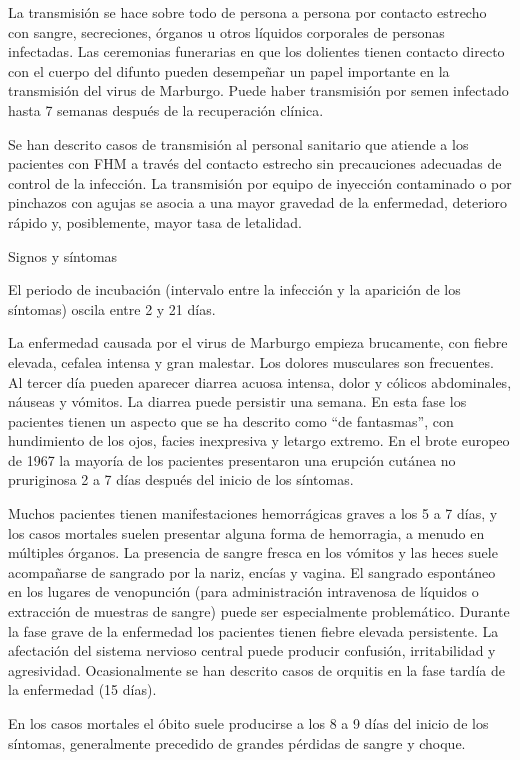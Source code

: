 La transmisión se hace sobre todo de persona a persona por contacto estrecho con sangre, secreciones, órganos u otros líquidos corporales de personas infectadas. Las ceremonias funerarias en que los dolientes tienen contacto directo con el cuerpo del difunto pueden desempeñar un papel importante en la transmisión del virus de Marburgo. Puede haber transmisión por semen infectado hasta 7 semanas después de la recuperación clínica.

Se han descrito casos de transmisión al personal sanitario que atiende a los pacientes con FHM a través del contacto estrecho sin precauciones adecuadas de control de la infección. La transmisión por equipo de inyección contaminado o por pinchazos con agujas se asocia a una mayor gravedad de la enfermedad, deterioro rápido y, posiblemente, mayor tasa de letalidad.

Signos y síntomas

El periodo de incubación (intervalo entre la infección y la aparición de los síntomas) oscila entre 2 y 21 días.

La enfermedad causada por el virus de Marburgo empieza brucamente, con fiebre elevada, cefalea intensa y gran malestar. Los dolores musculares son frecuentes. Al tercer día pueden aparecer diarrea acuosa intensa, dolor y cólicos abdominales, náuseas y vómitos. La diarrea puede persistir una semana. En esta fase los pacientes tienen un aspecto que se ha descrito como “de fantasmas”, con hundimiento de los ojos, facies inexpresiva y letargo extremo. En el brote europeo de 1967 la mayoría de los pacientes presentaron una erupción cutánea no pruriginosa 2 a 7 días después del inicio de los síntomas.

Muchos pacientes tienen manifestaciones hemorrágicas graves a los 5 a 7 días, y los casos mortales suelen presentar alguna forma de hemorragia, a menudo en múltiples órganos. La presencia de sangre fresca en los vómitos y las heces suele acompañarse de sangrado por la nariz, encías y vagina. El sangrado espontáneo en los lugares de venopunción (para administración intravenosa de líquidos o extracción de muestras de sangre) puede ser especialmente problemático. Durante la fase grave de la enfermedad los pacientes tienen fiebre elevada persistente. La afectación del sistema nervioso central puede producir confusión, irritabilidad y agresividad. Ocasionalmente se han descrito casos de orquitis en la fase tardía de la enfermedad (15 días).

En los casos mortales el óbito suele producirse a los 8 a 9 días del inicio de los síntomas, generalmente precedido de grandes pérdidas de sangre y choque.

